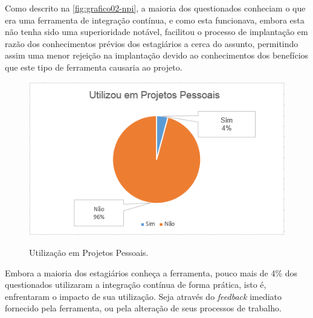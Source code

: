 Como descrito na \autoref{fig:grafico02-npi}, a maioria dos questionados conheciam o que era uma ferramenta de integração contínua, e como esta funcionava, embora esta não tenha sido uma superioridade notável, facilitou o processo de implantação em razão dos conhecimentos prévios dos estagiários a cerca do assunto, permitindo assim uma menor rejeição na implantação devido ao conhecimentos dos benefícios que este tipo de ferramenta causaria ao projeto.

\begin{figure}[H]
\centering
\caption[Utilização em Projetos Pessoais]{Utilização em Projetos Pessoais.}\includegraphics[scale=0.9]{./images/grafico-ci03}
\label{fig:grafico03-npi}
\end{figure}

Embora a maioria dos estagiários conheça a ferramenta, pouco mais de 4\% dos questionados utilizaram a integração contínua de forma prática, isto é, enfrentaram o impacto de sua utilização. Seja através do \textit{feedback} imediato fornecido pela ferramenta, ou pela alteração de seus processos de trabalho.	


